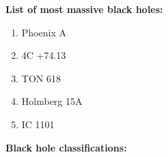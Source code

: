 \hrulefill

\textbf{List of most massive black holes:}
\begin{enumerate}
  \item Phoenix A
  \item 4C +74.13
  \item TON 618
  \item Holmberg 15A
  \item IC 1101
\end{enumerate}

\hrulefill

\textbf{Black hole classifications:}
